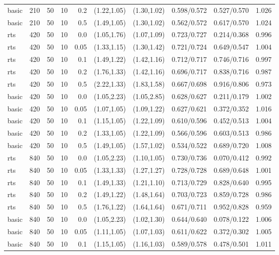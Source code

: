 \begin{tabular}{llrrrccccc}
basic & 210 & 50 & 10 & 0.2 & (1.22,1.05) & (1.30,1.02) & 0.598/0.572 & 0.527/0.570 & 1.026 \\
basic & 210 & 50 & 10 & 0.5 & (1.49,1.05) & (1.30,1.02) & 0.562/0.572 & 0.617/0.570 & 1.024 \\
rts & 420 & 50 & 10 & 0.0 & (1.05,1.76) & (1.07,1.09) & 0.723/0.727 & 0.214/0.368 & 0.996 \\
rts & 420 & 50 & 10 & 0.05 & (1.33,1.15) & (1.30,1.42) & 0.721/0.724 & 0.649/0.547 & 1.004 \\
rts & 420 & 50 & 10 & 0.1 & (1.49,1.22) & (1.42,1.16) & 0.712/0.717 & 0.746/0.716 & 0.997 \\
rts & 420 & 50 & 10 & 0.2 & (1.76,1.33) & (1.42,1.16) & 0.696/0.717 & 0.838/0.716 & 0.987 \\
rts & 420 & 50 & 10 & 0.5 & (2.22,1.33) & (1.83,1.58) & 0.667/0.698 & 0.916/0.806 & 0.973 \\
basic & 420 & 50 & 10 & 0.0 & (1.05,2.23) & (1.05,2.85) & 0.628/0.627 & 0.211/0.179 & 1.002 \\
basic & 420 & 50 & 10 & 0.05 & (1.07,1.05) & (1.09,1.22) & 0.627/0.621 & 0.372/0.352 & 1.016 \\
basic & 420 & 50 & 10 & 0.1 & (1.15,1.05) & (1.22,1.09) & 0.610/0.596 & 0.452/0.513 & 1.004 \\
basic & 420 & 50 & 10 & 0.2 & (1.33,1.05) & (1.22,1.09) & 0.566/0.596 & 0.603/0.513 & 0.986 \\
basic & 420 & 50 & 10 & 0.5 & (1.49,1.05) & (1.57,1.02) & 0.534/0.522 & 0.689/0.720 & 1.008 \\
rts & 840 & 50 & 10 & 0.0 & (1.05,2.23) & (1.10,1.05) & 0.730/0.736 & 0.070/0.412 & 0.992 \\
rts & 840 & 50 & 10 & 0.05 & (1.33,1.33) & (1.27,1.27) & 0.728/0.728 & 0.689/0.648 & 1.001 \\
rts & 840 & 50 & 10 & 0.1 & (1.49,1.33) & (1.21,1.10) & 0.713/0.729 & 0.828/0.640 & 0.995 \\
rts & 840 & 50 & 10 & 0.2 & (1.49,1.22) & (1.48,1.64) & 0.703/0.723 & 0.859/0.728 & 0.986 \\
rts & 840 & 50 & 10 & 0.5 & (1.76,1.22) & (1.64,1.64) & 0.671/0.711 & 0.952/0.828 & 0.959 \\
basic & 840 & 50 & 10 & 0.0 & (1.05,2.23) & (1.02,1.30) & 0.644/0.640 & 0.078/0.122 & 1.006 \\
basic & 840 & 50 & 10 & 0.05 & (1.11,1.05) & (1.07,1.03) & 0.611/0.622 & 0.372/0.302 & 1.005 \\
basic & 840 & 50 & 10 & 0.1 & (1.15,1.05) & (1.16,1.03) & 0.589/0.578 & 0.478/0.501 & 1.011 \\

\end{tabular}
